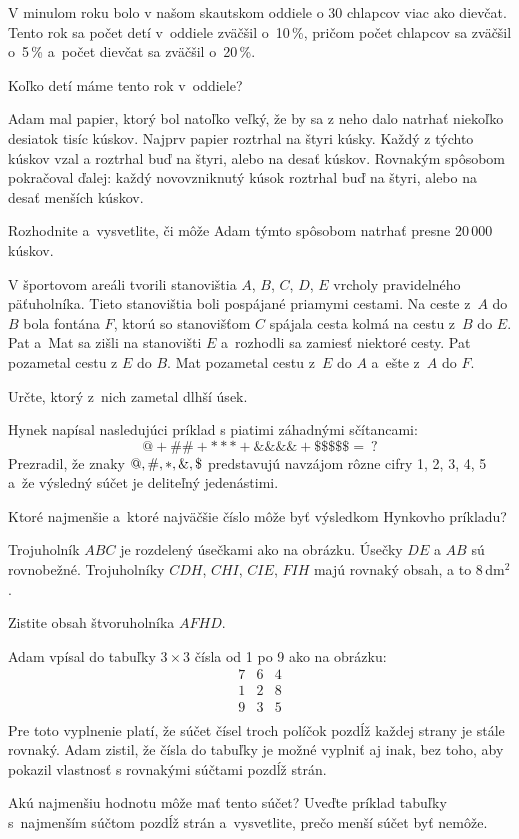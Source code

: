 {%
V minulom roku bolo v našom skautskom oddiele o 30 chlapcov viac ako dievčat.
Tento rok sa počet detí v~oddiele zväčšil o~10\,\%, pričom počet chlapcov sa zväčšil o~5\,\% a~počet dievčat sa zväčšil o~20\,\%.

Koľko detí máme tento rok v~oddiele?
}

{%
Adam mal papier, ktorý bol natoľko veľký, že by sa z neho dalo natrhať niekoľko desiatok tisíc kúskov.
Najprv papier roztrhal na štyri kúsky.
Každý z týchto kúskov vzal a roztrhal buď na štyri, alebo na desať kúskov.
Rovnakým spôsobom pokračoval ďalej: každý novovzniknutý kúsok roztrhal buď na štyri, alebo na desať menších kúskov.

Rozhodnite a~vysvetlite, či môže Adam týmto spôsobom natrhať presne 20\,000 kúskov.
}

{%
V športovom areáli tvorili stanovištia $A$, $B$, $C$, $D$, $E$ vrcholy pravidelného päťuholníka.
Tieto stanovištia boli pospájané priamymi cestami.
Na ceste z~$A$ do $B$ bola fontána $F$, ktorú so stanovišťom $C$ spájala cesta kolmá na cestu z~$B$ do $E$.
Pat a~Mat sa zišli na stanovišti $E$ a~rozhodli sa zamiesť niektoré cesty.
Pat pozametal cestu z $E$ do $B$.
Mat pozametal cestu z~$E$ do $A$ a~ešte z~$A$ do $F$.

Určte, ktorý z~nich zametal dlhší úsek.
}

{%
Hynek napísal nasledujúci príklad s piatimi záhadnými sčítancami:
$$
@ + \#\# + *** + \&\&\&\& + \$\$\$\$\$ =\ ?
$$
Prezradil, že znaky $@, \#, *, \&, \text{\textdollar}$ predstavujú navzájom rôzne cifry 1, 2, 3, 4, 5 a~že výsledný súčet je deliteľný jedenástimi.

Ktoré najmenšie a~ktoré najväčšie číslo môže byť výsledkom Hynkovho príkladu?
}

{%
Trojuholník $ABC$ je rozdelený úsečkami ako na obrázku.
Úsečky $DE$ a $AB$ sú rovnobežné.
Trojuholníky $CDH$, $CHI$, $CIE$, $FIH$ majú rovnaký obsah, a to 8\,dm$^2$.

Zistite obsah štvoruholníka $AFHD$.
%
}

{%
Adam vpísal do tabuľky $3\times 3$ čísla od 1 po 9 ako na obrázku:
$$
\begin{array}{ccc}
7 & 6 & 4 \\
1 & 2 & 8 \\
9 & 3 & 5 \\
\end{array}
$$
Pre toto vyplnenie platí, že súčet čísel troch políčok pozdĺž každej strany je stále rovnaký.
Adam zistil, že čísla do tabuľky je možné vyplniť aj inak, bez toho, aby pokazil vlastnosť s rovnakými súčtami pozdĺž strán.

Akú najmenšiu hodnotu môže mať tento súčet?
Uveďte príklad tabuľky s~najmenším súčtom pozdĺž strán a~vysvetlite, prečo menší súčet byť nemôže.
}

